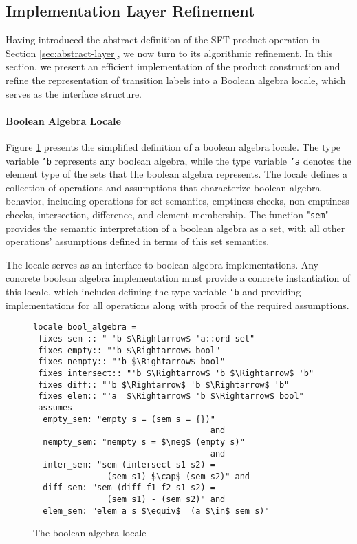 \subsection{Implementation Layer Refinement}
\label{sec_alg_refinement}
Having introduced the abstract definition of the SFT product operation in Section \ref{sec:abstract-layer}, we now turn to its algorithmic refinement. In this section, we present an efficient implementation of the product construction and refine the representation of transition labels into a Boolean algebra locale, which serves as the interface structure.


\paragraph{Boolean Algebra Locale}

Figure \ref{fig-bool-algebra-locale} presents the simplified definition of a boolean algebra locale. The type variable \texttt{'b} represents any boolean algebra, while the type variable \texttt{'a} denotes the element type of the sets that the boolean algebra represents. The locale defines a collection of operations and assumptions that characterize boolean algebra behavior, including operations for set semantics, emptiness checks, non-emptiness checks, intersection, difference, and element membership. The function "\texttt{sem}" provides the semantic interpretation of a boolean algebra as a set, with all other operations' assumptions defined in terms of this set semantics.

The locale serves as an interface to boolean algebra implementations. Any concrete boolean algebra implementation must provide a concrete instantiation of this locale, which includes defining the type variable \texttt{'b} and providing implementations for all operations along with proofs of the required assumptions.


\begin{figure}[hbt!]
\begin{lstlisting}[mathescape=true]
locale bool_algebra =
 fixes sem :: " 'b $\Rightarrow$ 'a::ord set"
 fixes empty:: "'b $\Rightarrow$ bool"
 fixes nempty:: "'b $\Rightarrow$ bool"
 fixes intersect:: "'b $\Rightarrow$ 'b $\Rightarrow$ 'b"
 fixes diff:: "'b $\Rightarrow$ 'b $\Rightarrow$ 'b"
 fixes elem:: "'a  $\Rightarrow$ 'b $\Rightarrow$ bool"
 assumes
  empty_sem: "empty s = (sem s = {})"
                                    and
  nempty_sem: "nempty s = $\neg$ (empty s)" 
                                    and
  inter_sem: "sem (intersect s1 s2) =
               (sem s1) $\cap$ (sem s2)" and
  diff_sem: "sem (diff f1 f2 s1 s2) =
               (sem s1) - (sem s2)" and
  elem_sem: "elem a s $\equiv$  (a $\in$ sem s)"
\end{lstlisting}
\caption{The boolean algebra locale}
\label{fig-bool-algebra-locale}
\end{figure}




